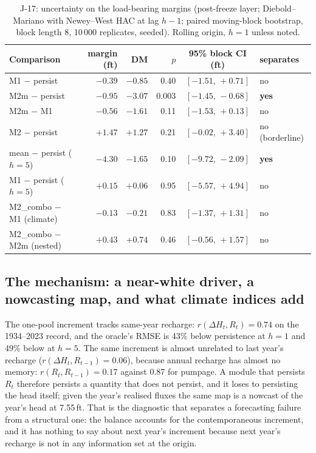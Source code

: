 \begin{table}[!htb]
\centering\small
\caption{J-17: uncertainty on the load-bearing margins (post-freeze layer; Diebold--Mariano with Newey--West HAC at lag $h-1$; paired moving-block bootstrap, block length 8, 10\,000 replicates, seeded). Rolling origin, $h=1$ unless noted.}
\label{tab:edwdm}
\scriptsize\setlength{\tabcolsep}{3pt}
\begin{tabular}{@{}lrrrcl@{}}
\toprule
Comparison & margin (ft) & DM & $p$ & 95\% block CI (ft) & separates \\
\midrule
M1 $-$ persist & $-0.39$ & $-0.85$ & 0.40 & $[-1.51,\,+0.71]$ & no \\
M2m $-$ persist & $-0.95$ & $-3.07$ & 0.003 & $[-1.45,\,-0.68]$ & \textbf{yes} \\
M2m $-$ M1 & $-0.56$ & $-1.61$ & 0.11 & $[-1.53,\,+0.13]$ & no \\
M2 $-$ persist & $+1.47$ & $+1.27$ & 0.21 & $[-0.02,\,+3.40]$ & no (borderline) \\
mean $-$ persist ($h=5$) & $-4.30$ & $-1.65$ & 0.10 & $[-9.72,\,-2.09]$ & \textbf{yes} \\
M1 $-$ persist ($h=5$) & $+0.15$ & $+0.06$ & 0.95 & $[-5.57,\,+4.94]$ & no \\
M2\_combo $-$ M1 (climate) & $-0.13$ & $-0.21$ & 0.83 & $[-1.37,\,+1.31]$ & no \\
M2\_combo $-$ M2m (nested) & $+0.43$ & $+0.74$ & 0.46 & $[-0.56,\,+1.57]$ & no \\
\bottomrule
\end{tabular}
\end{table}

\FloatBarrier
\subsection{The mechanism: a near-white driver, a nowcasting map, and what climate indices add}\label{sec:edw_mech}

The one-pool increment tracks same-year recharge: $r(\Delta H_t,R_t)=0.74$ on the 1934--2023 record, and the oracle's RMSE is 43\% below persistence at $h=1$ and 49\% below at $h=5$. The same increment is almost unrelated to last year's recharge ($r(\Delta H_t,R_{t-1})=0.06$), because annual recharge has almost no memory: $r(R_t,R_{t-1})=0.17$ against 0.87 for pumpage. A module that persists $R_t$ therefore persists a quantity that does not persist, and it loses to persisting the head itself; given the year's realised fluxes the same map is a nowcast of the year's head at 7.55\,ft. That is the diagnostic that separates a forecasting failure from a structural one: the balance accounts for the contemporaneous increment, and it has nothing to say about next year's increment because next year's recharge is not in any information set at the origin.

